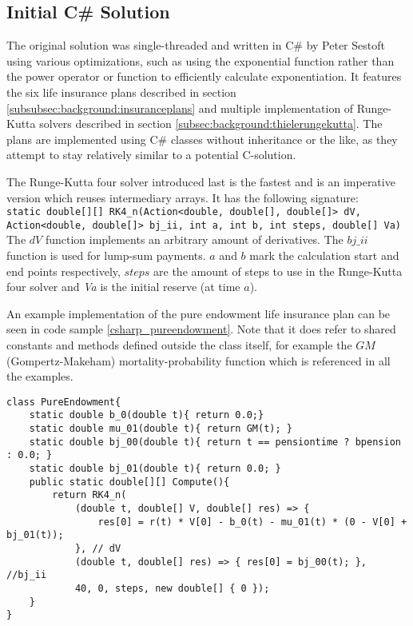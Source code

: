 \subsection{Initial C\# Solution}\label{subsec:initialsolution}
The original solution was single-threaded and written in C\# by Peter Sestoft using various optimizations, such as using the exponential function rather than the power operator or function to efficiently calculate exponentiation.
It features the six life insurance plans described in section \ref{subsubsec:background:insuranceplans} and multiple implementation of Runge-Kutta solvers described in section \ref{subsec:background:thielerungekutta}.
The plans are implemented using C\# classes without inheritance or the like, as they attempt to stay relatively similar to a potential C-solution.

The Runge-Kutta four solver introduced last is the fastest and is an imperative version which reuses intermediary arrays.
It has the following signature: \\
\lstinline$static double[][] RK4_n(Action<double, double[], double[]> dV, Action<double, double[]> bj_ii, int a, int b, int steps, double[] Va)$
\\
The $dV$ function implements an arbitrary amount of derivatives.
The $bj\_ii$ function is used for lump-sum payments.
$a$ and $b$ mark the calculation start and end points respectively, $steps$ are the amount of steps to use in the Runge-Kutta four solver and \textit{Va} is the initial reserve (at time $a$).

An example implementation of the pure endowment life insurance plan can be seen in code sample \ref{csharp_pureendowment}. 
Note that it does refer to shared constants and methods defined outside the class itself, for example the $GM$ (Gompertz-Makeham) mortality-probability function which is referenced in all the examples.
\begin{lstlisting}[language=CSharp, caption=The pure endowment insurance plan expressed in C\#, label=csharp_pureendowment]
class PureEndowment{
    static double b_0(double t){ return 0.0;}
    static double mu_01(double t){ return GM(t); }
    static double bj_00(double t){ return t == pensiontime ? bpension : 0.0; }
    static double bj_01(double t){ return 0.0; }
    public static double[][] Compute(){
        return RK4_n(
            (double t, double[] V, double[] res) => { 
                res[0] = r(t) * V[0] - b_0(t) - mu_01(t) * (0 - V[0] + bj_01(t)); 
            }, // dV
            (double t, double[] res) => { res[0] = bj_00(t); }, //bj_ii
            40, 0, steps, new double[] { 0 });
    }
}
\end{lstlisting}


